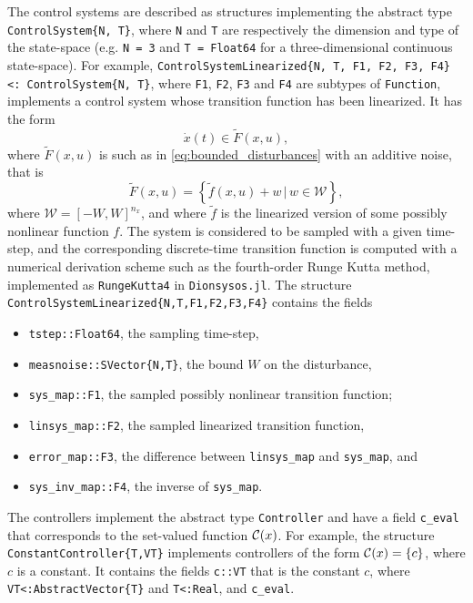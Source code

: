 \documentclass{juliacon}
\begin{document}
The control systems are described as structures implementing the abstract type \texttt{ControlSystem\{N, T\}}, where \texttt{N} and \texttt{T} are respectively the dimension and type of the state-space (e.g. \texttt{N = 3} and \texttt{T = Float64} for a three-dimensional continuous state-space). For example, \texttt{ControlSystemLinearized\{N, T, F1, F2, F3, F4\} <: ControlSystem\{N, T\}}, where \texttt{F1}, \texttt{F2}, \texttt{F3} and \texttt{F4} are subtypes of \texttt{Function}, implements a control system whose transition function has been linearized. It has the form
\begin{equation}
    \dot{x}(t) \in \tilde{F}(x, u), 
\end{equation}
where $\tilde{F}(x, u)$ is such as in \eqref{eq:bounded_disturbances} with an additive noise, that is
\begin{equation}
    \tilde{F}(x, u) = \left\{\tilde{f}(x, u) + w \, | \, w \in \mathcal{W}\right\}, 
\end{equation}
where $\mathcal{W} = [-W, W]^{n_x}$, and where $\tilde{f}$ is the linearized version of some possibly nonlinear function $f$. The system is considered to be sampled with a given time-step, and the corresponding discrete-time transition function is computed with a numerical derivation scheme such as the fourth-order Runge Kutta method, implemented as 
\texttt{RungeKutta4} in \texttt{Dionsysos.jl}. The structure \texttt{ControlSystemLinearized\{N,T,F1,F2,F3,F4\}} contains the fields
\begin{itemize}
    \item \texttt{tstep::Float64}, the sampling time-step,  
    \item \texttt{measnoise::SVector\{N,T\}}, the bound $W$ on the disturbance, 
    \item \texttt{sys\_map::F1}, the sampled possibly nonlinear transition function; 
    \item \texttt{linsys\_map::F2}, the sampled linearized transition function, 
    \item \texttt{error\_map::F3}, the difference between \texttt{linsys\_map} and \texttt{sys\_map}, and
    \item \texttt{sys\_inv\_map::F4}, the inverse of \texttt{sys\_map}.
\end{itemize} 

\vskip 6pt

The controllers implement the abstract type \texttt{Controller} and have a field \texttt{c\_eval} that corresponds to the set-valued function $\mathcal{C}(x)$. For example, the structure \texttt{ConstantController\{T,VT\}} implements controllers of the form $\mathcal{C}(x) = \{c\}$, where $c$ is a constant. It contains the fields \texttt{c::VT} that is the constant $c$, where \texttt{VT<:AbstractVector\{T\}} and \texttt{T<:Real}, and \texttt{c\_eval}.
\end{document}

